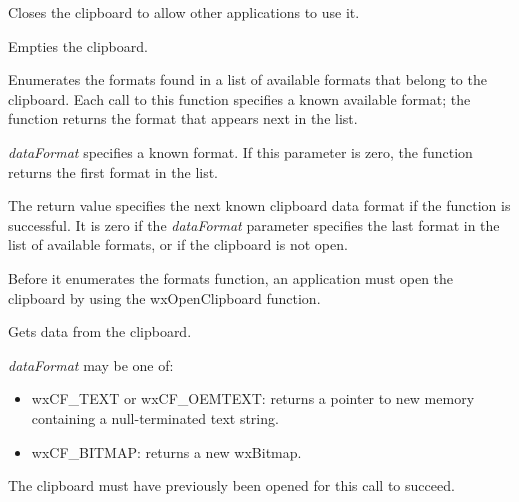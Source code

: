 
Closes the clipboard to allow other applications to use it.


\label{wxemptyclipboard}


Empties the clipboard.


\label{wxenumclipboardformats}


Enumerates the formats found in a list of available formats that belong
to the clipboard. Each call to this  function specifies a known
available format; the function returns the format that appears next in
the list.

{\it dataFormat} specifies a known format. If this parameter is zero,
the function returns the first format in the list.

The return value specifies the next known clipboard data format if the
function is successful. It is zero if the {\it dataFormat} parameter specifies
the last  format in the list of available formats, or if the clipboard
is not open.

Before it enumerates the formats function, an application must open the clipboard by using the
wxOpenClipboard function.


\label{wxgetclipboarddata}


Gets data from the clipboard.

{\it dataFormat} may be one of:

\begin{itemize}\itemsep=0pt
\item wxCF\_TEXT or wxCF\_OEMTEXT: returns a pointer to new memory containing a null-terminated text string.
\item wxCF\_BITMAP: returns a new wxBitmap.
\end{itemize}

The clipboard must have previously been opened for this call to succeed.


\label{wxgetclipboardformatname}



